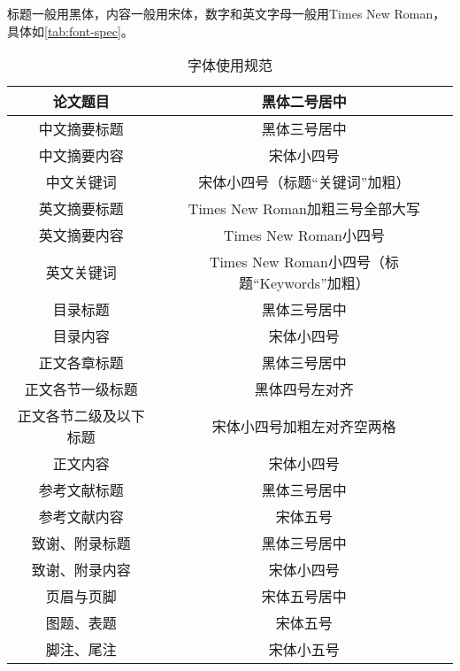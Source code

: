 标题一般用黑体，内容一般用宋体，数字和英文字母一般用Times New Roman，具体如\autoref{tab:font-spec}。

\begin{table}[]
    \caption{字体使用规范}
    \begin{tabular}{|c|c|}
    \hline
    论文题目        & 黑体二号居中                             \\ \hline
    中文摘要标题      & 黑体三号居中                             \\ \hline
    中文摘要内容      & 宋体小四号                              \\ \hline
    中文关键词       & 宋体小四号（标题``关键词''加粗）                   \\ \hline
    英文摘要标题      & Times New Roman加粗三号全部大写            \\ \hline
    英文摘要内容      & Times New Roman小四号                 \\ \hline
    英文关键词       & Times New Roman小四号（标题``Keywords''加粗） \\ \hline
    目录标题        & 黑体三号居中                             \\ \hline
    目录内容        & 宋体小四号                              \\ \hline
    正文各章标题      & 黑体三号居中                             \\ \hline
    正文各节一级标题    & 黑体四号左对齐                            \\ \hline
    正文各节二级及以下标题 & 宋体小四号加粗左对齐空两格                      \\ \hline
    正文内容        & 宋体小四号                              \\ \hline
    参考文献标题      & 黑体三号居中                             \\ \hline
    参考文献内容      & 宋体五号                               \\ \hline
    致谢、附录标题     & 黑体三号居中                             \\ \hline
    致谢、附录内容     & 宋体小四号                              \\ \hline
    页眉与页脚       & 宋体五号居中                             \\ \hline
    图题、表题       & 宋体五号                               \\ \hline
    脚注、尾注       & 宋体小五号                              \\ \hline
    \end{tabular}
    \label{tab:font-spec}
\end{table}


